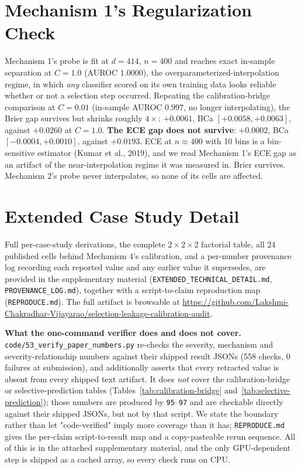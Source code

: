 \documentclass{article}
\begin{document}
\section{Mechanism 1's Regularization Check}
\label{app:reg}
Mechanism 1's probe is fit at $d=414$, $n=400$ and reaches exact in-sample
separation at $C=1.0$ (AUROC $1.0000$), the overparameterized-interpolation
regime, in which \emph{any} classifier scored on its own training data looks
reliable whether or not a selection step occurred. Repeating the
calibration-bridge comparison at $C=0.01$ (in-sample AUROC $0.997$, no longer
interpolating), the Brier gap survives but shrinks roughly $4\times$:
$+0.0061$, BCa $[+0.0058,+0.0063]$, against $+0.0260$ at $C=1.0$. \textbf{The
ECE gap does not survive}: $+0.0002$, BCa $[-0.0004,+0.0010]$, against
$+0.0193$. ECE at $n\approx400$ with 10 bins is a bin-sensitive estimator
(Kumar et al., 2019), and we read Mechanism 1's ECE gap as an artifact of the
near-interpolation regime it was measured in. Brier survives. Mechanism 2's
probe never interpolates, so none of its cells are affected.

\section{Extended Case Study Detail}
\label{app:cases}
Full per-case-study derivations, the complete $2\times2\times2$ factorial
table, all 24 published
cells behind Mechanism 4's calibration, and a per-number provenance log
recording each reported value and any earlier value it supersedes, are
provided in the supplementary material
(\texttt{EXTENDED\_TECHNICAL\_DETAIL.md}, \texttt{PROVENANCE\_LOG.md}),
together with a script-to-claim reproduction map (\texttt{REPRODUCE.md}).
The full artifact is browsable at \url{https://github.com/Lakshmi-Chakradhar-Vijayarao/selection-leakage-calibration-audit}.

\textbf{What the one-command verifier does and does not cover.}
\texttt{code/53\_verify\_paper\_numbers.py} re-checks the severity, mechanism
and severity-relationship numbers against their shipped result JSONs (558
checks, 0 failures at submission), and additionally asserts that every
retracted value is absent from every shipped text artifact. It does
\emph{not} cover the calibration-bridge or selective-prediction tables
(Tables~\ref{tab:calibration-bridge} and~\ref{tab:selective-prediction});
those numbers are produced by \texttt{95}--\texttt{97} and are checkable
directly against their shipped JSONs, but not by that script. We state the
boundary rather than let "code-verified" imply more coverage than it has; \texttt{REPRODUCE.md} gives the
per-claim script-to-result map and a copy-pasteable rerun sequence. All of
this is in the attached supplementary material, and the only GPU-dependent
step is shipped as a cached array, so every check runs on CPU.
\end{document}

